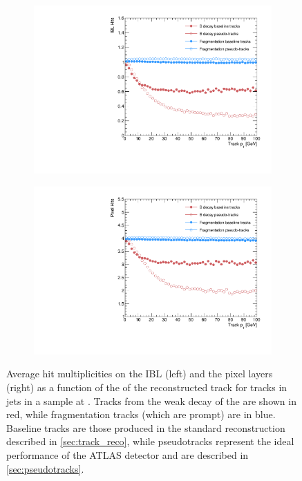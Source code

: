 \begin{figure}[!htbp]
  \centering
  \begin{subfigure}{.48\textwidth}
    \centering
    \includegraphics[width=\textwidth]{chapters/3.tracking/figs/overlay_po_nHitsOnIBL_From_B_pT.pdf}
  \end{subfigure}%
  \begin{subfigure}{.48\textwidth}
    \centering
    \includegraphics[width=\textwidth]{chapters/3.tracking/figs/overlay_po_nHitsOnPix_From_B_pT.pdf}
  \end{subfigure}
  \caption{
    Average hit multiplicities on the IBL (left) and the pixel layers (right) as a function of the \pT of the reconstructed track for tracks in jets in a \Zprime sample at .
    Tracks from the weak decay of the \bhadron are shown in red, while fragmentation tracks (which are prompt) are in blue.
    Baseline tracks are those produced in the standard reconstruction described in \cref{sec:track_reco}, while pseudotracks represent the ideal performance of the ATLAS detector and are described in \cref{sec:pseudotracks}.
  }
  \label{fig:pseudo_pix_hits}
\end{figure}

